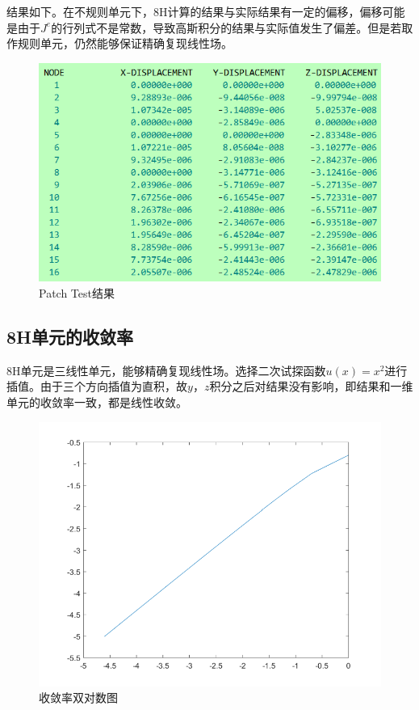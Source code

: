 \documentclass{ctexart}
\begin{document}
结果如下。在不规则单元下，8H计算的结果与实际结果有一定的偏移，偏移可能是由于$J^{e}$的行列式不是常数，导致高斯积分的结果与实际值发生了偏差。但是若取作规则单元，仍然能够保证精确复现线性场。

\begin{figure}[H]
\centering  
\includegraphics[width = .8\textwidth]{h8_3.png} 
\caption{Patch Test结果} 
\label{f2.3} 
\end{figure}

\subsection{8H单元的收敛率}
8H单元是三线性单元，能够精确复现线性场。选择二次试探函数$ u(x)=x^{2} $进行插值。由于三个方向插值为直积，故$y$，$z$积分之后对结果没有影响，即结果和一维单元的收敛率一致，都是线性收敛。
\begin{figure}[H]
\centering  
\includegraphics[width = .8\textwidth]{h8_4.png} 
\caption{收敛率双对数图} 
\label{f2.4} 
\end{figure}
\end{document}

